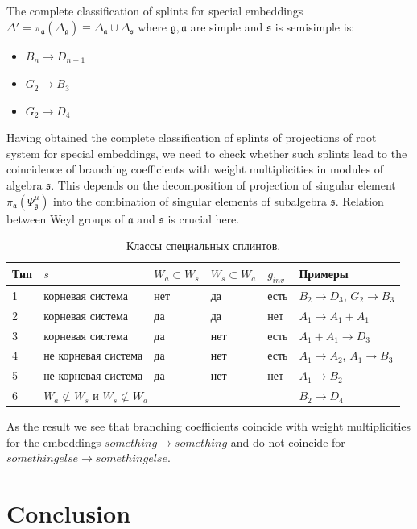 \documentclass{article}
\newcommand{\pia}{\pi_{\mathfrak{a}}}
\newcommand{\gf}{\mathfrak{g}}
\newcommand{\af}{\mathfrak{a}}
\newcommand{\sfr}{\mathfrak{s}}
\begin{document}
The complete classification of splints for special embeddings $\Delta'=\pia(\Delta_{\gf})
\equiv \Delta_{\af}\cup \Delta_{\sfr}$ where $\gf, \af$ are simple and $\sfr$ is semisimple is:
\begin{itemize}
\item $B_{n}\to D_{n+1}$
\item $G_{2}\to B_{3}$
\item $G_{2}\to D_{4}$
\end{itemize}



Having obtained the complete classification of splints of projections of root system for special
embeddings, we need to check whether such splints lead to the coincidence of branching coefficients
with weight multiplicities in modules of algebra $\sfr$. This depends on the decomposition of
projection of singular element $\pia\left(\Psi^{\mu}_{\gf}\right)$ into the combination of
singular elements of subalgebra $\sfr$. Relation between Weyl groups of $\af$ and $\sfr$ is crucial
here. 

\begin{table}[h]
\begin{tabular}[t]{|p{2em}|p{6em}|p{5em}|p{5em}|p{2em}|p{6em}|}
\hline
Тип & $s$ & $W_a\subset W_s$ & $W_s\subset W_a$ & $g_{inv} $ & Примеры \\
\hline
1 & корневая система & нет & да & есть  & $B_2\rightarrow D_3$, $G_2\rightarrow B_3$\\
\hline
2 & корневая система  & да & да & нет & $A_1\rightarrow A_1+A_1$ \\
\hline
3 & корневая система  & да & нет & есть & $A_1+A_1\rightarrow D_3$ \\
\hline
4 & не корневая система  & да & нет & есть & $A_1\rightarrow A_2$, $A_1\rightarrow B_3$\\
\hline
5 & не корневая система  & да & нет & нет  & $A_1\rightarrow B_2$\\
\hline
6 & \multicolumn{4}{|l|}{$W_a\not\subset W_s$ и $W_s\not\subset W_a$} & $B_2\rightarrow D_4$\\
\hline
\end{tabular}
\caption{Классы специальных сплинтов.}
\label {spsp}
\end{table}

As the result we see that branching coefficients coincide with weight multiplicities for
the embeddings $something\to something$ and do not coincide for $something else\to something else$. 

\section*{Conclusion}
\label{sec:conclusion}
\end{document}
